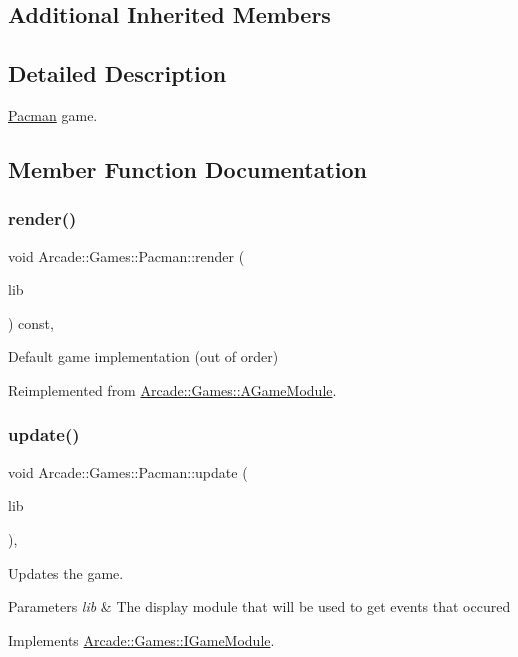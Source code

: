 \subsection*{Additional Inherited Members}


\subsection{Detailed Description}
\mbox{\hyperlink{classArcade_1_1Games_1_1Pacman}{Pacman}} game. 

\subsection{Member Function Documentation}
\mbox{\label{classArcade_1_1Games_1_1Pacman_ab1a7408f265efbef12b4f9d1a6fb4512}} 
\subsubsection{\texorpdfstring{render()}{render()}}
{\footnotesize\ttfamily void Arcade\+::\+Games\+::\+Pacman\+::render (\begin{DoxyParamCaption}\item[{\mbox{\hyperlink{classArcade_1_1Display_1_1IDisplayModule}{Arcade\+::\+Display\+::\+I\+Display\+Module}} \&}]{lib }\end{DoxyParamCaption}) const\hspace{0.3cm}{\ttfamily [final]}, {\ttfamily [virtual]}}

Default game implementation (out of order) 

Reimplemented from \mbox{\hyperlink{classArcade_1_1Games_1_1AGameModule_a5897780d42d5faba3287c29b87f2b498}{Arcade\+::\+Games\+::\+A\+Game\+Module}}.

\mbox{\label{classArcade_1_1Games_1_1Pacman_aa6bc227c3f14cc8d66d11f2d32bed3ec}} 
\subsubsection{\texorpdfstring{update()}{update()}}
{\footnotesize\ttfamily void Arcade\+::\+Games\+::\+Pacman\+::update (\begin{DoxyParamCaption}\item[{const \mbox{\hyperlink{classArcade_1_1Display_1_1IDisplayModule}{Arcade\+::\+Display\+::\+I\+Display\+Module}} \&}]{lib }\end{DoxyParamCaption})\hspace{0.3cm}{\ttfamily [final]}, {\ttfamily [virtual]}}



Updates the game. 


\begin{DoxyParams}{Parameters}
{\em lib} & The display module that will be used to get events that occured \\
\hline
\end{DoxyParams}


Implements \mbox{\hyperlink{classArcade_1_1Games_1_1IGameModule_a421d1064fcc112dfc7ea025fc7f88aa7}{Arcade\+::\+Games\+::\+I\+Game\+Module}}.

